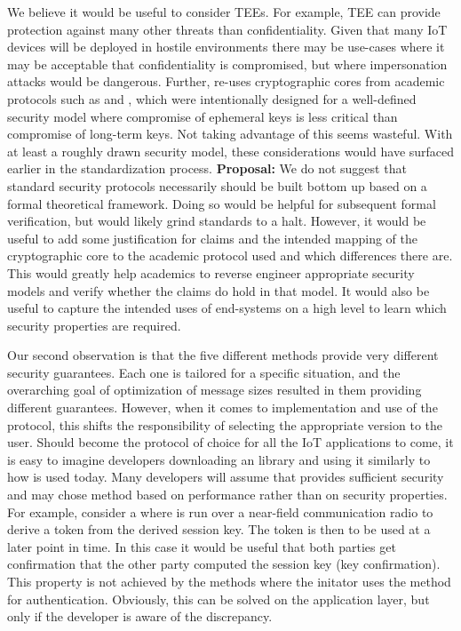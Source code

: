 \documentclass[runningheads,draft,x11names]{llncs}
\begin{document}
We believe it would be useful to consider TEEs. 
%
For example, TEE can provide protection against many other threats than
confidentiality.
%
Given that many IoT devices will be deployed in hostile environments there may
be use-cases where it may be acceptable that confidentiality is compromised, but
where impersonation attacks would be dangerous.
%
Further, \mEdhoc{} re-uses cryptographic cores from academic protocols such as
\mSigma{} and \mOptls, which were intentionally designed for a well-defined
security model where compromise of ephemeral keys is less critical than
compromise of long-term keys.
%
Not taking advantage of this seems wasteful.
%
With at least a roughly drawn security model, these considerations would have
surfaced earlier in the standardization process.
%
\textbf{Proposal:} We do not suggest that standard security protocols
necessarily should be built bottom up based on a formal theoretical framework.
%
Doing so would be helpful for subsequent formal verification, but would
likely grind standards to a halt.
%
However, it would be useful to add some justification for claims and the
intended mapping of the cryptographic core to the academic protocol used and
which differences there are.
%
This would greatly help academics to reverse engineer appropriate security
models and verify whether the claims do hold in that model.
%
It would also be useful to capture the intended uses of end-systems on a high
level to learn which security properties are required.
%

Our second observation is that the five different methods provide very different
security guarantees.
%
Each one is tailored for a specific situation, and the overarching goal of
optimization of message sizes resulted in them providing different guarantees.
%
However, when it comes to implementation and use of the protocol, this shifts the
responsibility of selecting the appropriate version to the user.
%
Should \mEdhoc{} become the protocol of choice for all the IoT applications to
come, it is easy to imagine developers downloading an \mEdhoc{} library and using
it similarly to how \mTls{} is used today.
%
Many developers will assume that \mEdhoc{} provides sufficient security and may
chose method based on performance rather than on security properties.
%
For example, consider a  where \mEdhoc{} is run over a near-field
communication radio to derive a token from the derived session key.
%
The token is then to be used at a later point in time.
%
In this case it would be useful that both parties get confirmation that the
other party computed the session key (key confirmation).
%
This property is not achieved by the \mEdhoc{} methods where the initator uses the
\mStat{} method for authentication.
%
Obviously, this can be solved on the application layer, but only if the
developer is aware of the discrepancy.
%
\end{document}
